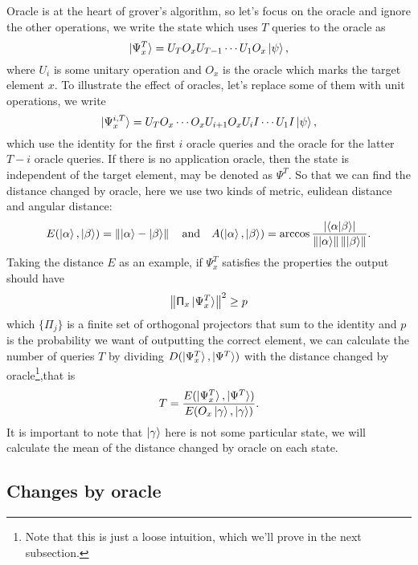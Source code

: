 \documentclass[a4paper,10pt]{article}
\numberwithin{equation}{subsection}
\begin{document}
Oracle is at the heart of grover's algorithm, so let's focus on the oracle and ignore the other operations, we write the state which uses $T$ queries to the oracle as
\begin{equation}
    \ket{\Psi_{x}^{T}}=U_{T}O_{x}U_{T-1}\cdots U_{1}O_{x}\ket{\psi},
\end{equation}
where $U_{i}$ is some unitary operation and $O_{x}$ is the oracle which marks the target element $x$. To illustrate the effect of oracles, let's replace some of them with unit operations, we write
\begin{equation}
    \ket{\Psi_{x}^{i,T}}=U_{T}O_{x}\cdots O_{x}U_{i+1}O_{x}U_{i}I\cdots U_{1}I\ket{\psi},
\end{equation}
which use the identity for the first $i$ oracle queries and the oracle for the latter $T-i$ oracle queries. If there is no application oracle,  then the state is independent of the target element, may be denoted as $\Psi^{T}$. So that we can find the distance changed by oracle, here we use two kinds of metric, eulidean distance and angular distance:
\begin{equation}
    E(\ket{\alpha},\ket{\beta})=\left\|\ket{\alpha}-\ket{\beta}\right\|
    \quad\text{and}\quad
    A(\ket{\alpha},\ket{\beta})=\arccos\frac{\left\lvert \braket{\alpha|\beta}\right\rvert}{\left\|\ket{\alpha}\right\|\left\|\ket{\beta}\right\|}.
\end{equation}
Taking the distance $E$ as an example, if $\Psi_{x}^{T}$ satisfies the properties the output should have
\begin{equation}
    \left\| \mathsf{\Pi}_{x}\ket{\Psi_{x}^{T}} \right\|^{2} \geq p
\end{equation}
which $\{\mathsf{\Pi}_{j}\}$ is a finite set of orthogonal projectors that sum to the identity and $p$ is the probability we want of outputting the correct element, we can calculate the number of queries $T$ by dividing $D(\ket{\Psi_{x}^{T}},\ket{\Psi^{T}})$ with the distance changed by oracle\footnote{Note that this is just a loose intuition, which we'll prove in the next subsection.},that is
\begin{equation}
    T=\frac{E(\ket{\Psi_{x}^{T}},\ket{\Psi^{T}})}{E(O_{x}\ket{\gamma},\ket{\gamma})}.
\end{equation}
It is important to note that $\ket{\gamma}$ here is not some particular state, we will calculate the mean of the distance changed by oracle on each state.



\subsection{Changes by oracle}
\end{document}
